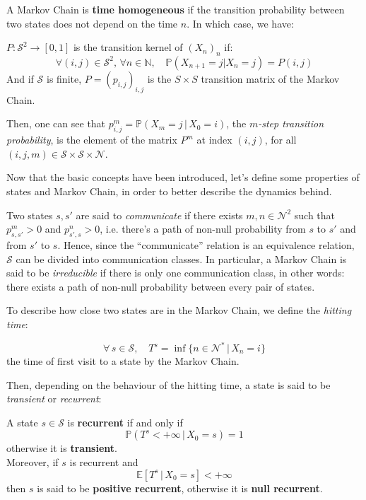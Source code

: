 A Markov Chain is \textbf{time homogeneous} if the transition probability between two states does not depend on the time $n$. In which case, we have:

\begin{defi} $P: \mathcal{S}^2 \to [0, 1]$ is the transition kernel of $(X_n)_n$ if:
  $$\forall (i, j) \in \mathcal{S}^2,\, \forall n \in \mathbb{N},\quad \mathbb{P}(X_{n+1} = j | X_n = j) = P(i, j)$$
  And if $\mathcal{S}$ is finite, $P = (p_{i, j})_{i, j}$ is the $S \times S$ transition matrix of the Markov Chain.
\end{defi}

Then, one can see that $p_{i, j}^m = \mathbb{P}(X_m = j \,|\, X_0 = i)$, the \emph{$m$-step transition probability}, is the element of the matrix $P^m$ at index $(i, j)$, for all $(i, j, m) \in \mathcal{S}\times \mathcal{S} \times \mathcal{N}$.

Now that the basic concepts have been introduced, let's define some properties of states and Markov Chain, in order to better describe the dynamics behind.

Two states $s, s'$ are said to \emph{communicate} if there exists $m, n \in \mathcal{N}^2$ such that $p_{s, s'}^m > 0$ and $p_{s', s}^n > 0$, i.e. there's a path of non-null probability from $s$ to $s'$ and from $s'$ to $s$. Hence, since the ``communicate'' relation is an equivalence relation, $\mathcal{S}$ can be divided into communication classes. In particular, a Markov Chain is said to be \emph{irreducible} if there is only one communication class, in other words: there exists a path of non-null probability between every pair of states.

To describe how close two states are in the Markov Chain, we define the \emph{hitting time}:
\begin{defi}
  $$\forall \, s \in \mathcal{S},\quad T^s = \inf \{n \in \mathcal{N}^* \,|\, X_n = i\}$$
  the time of first visit to a state by the Markov Chain.
\end{defi}

Then, depending on the behaviour of the hitting time, a state is said to be \emph{transient} or \emph{recurrent}:
\begin{defi}[Recurrence]
  A state $s \in \mathcal{S}$ is \textbf{recurrent} if and only if
  $$\mathbb{P}(T^s < +\infty \,|\, X_0 = s) = 1$$ otherwise it is \textbf{transient}.\\
  Moreover, if $s$ is recurrent and
  $$\mathbb{E}[T^s \,|\, X_0 = s] < +\infty$$
  then $s$ is said to be \textbf{positive recurrent}, otherwise it is \textbf{null recurrent}.
\end{defi}

